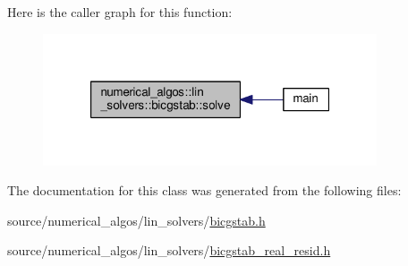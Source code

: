 Here is the caller graph for this function\-:
\nopagebreak
\begin{figure}[H]
\begin{center}
\leavevmode
\includegraphics[width=280pt]{classnumerical__algos_1_1lin__solvers_1_1bicgstab_ac3df95058825e4a8a1ed6bf838f10669_icgraph}
\end{center}
\end{figure}




The documentation for this class was generated from the following files\-:\begin{DoxyCompactItemize}
\item 
source/numerical\-\_\-algos/lin\-\_\-solvers/\hyperlink{bicgstab_8h}{bicgstab.\-h}\item 
source/numerical\-\_\-algos/lin\-\_\-solvers/\hyperlink{bicgstab__real__resid_8h}{bicgstab\-\_\-real\-\_\-resid.\-h}\end{DoxyCompactItemize}
